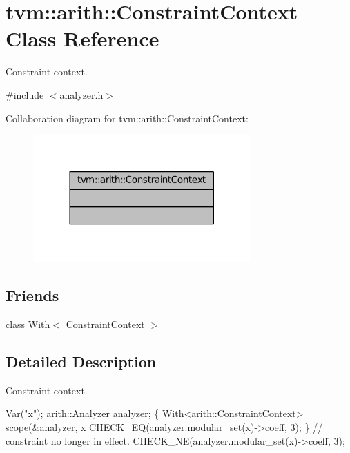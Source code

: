 \hypertarget{classtvm_1_1arith_1_1ConstraintContext}{}\section{tvm\+:\+:arith\+:\+:Constraint\+Context Class Reference}
\label{classtvm_1_1arith_1_1ConstraintContext}


Constraint context.  




{\ttfamily \#include $<$analyzer.\+h$>$}



Collaboration diagram for tvm\+:\+:arith\+:\+:Constraint\+Context\+:
\nopagebreak
\begin{figure}[H]
\begin{center}
\leavevmode
\includegraphics[width=236pt]{classtvm_1_1arith_1_1ConstraintContext__coll__graph}
\end{center}
\end{figure}
\subsection*{Friends}
\begin{DoxyCompactItemize}
\item 
class \hyperlink{classtvm_1_1arith_1_1ConstraintContext_acf0da349a64c42ae689d9459ae09f0e3}{With$<$ Constraint\+Context $>$}
\end{DoxyCompactItemize}


\subsection{Detailed Description}
Constraint context. 


\begin{DoxyCode}
Var(\textcolor{stringliteral}{"x"});
arith::Analyzer analyzer;
\{
  With<arith::ConstraintContext> scope(&analyzer, x %
  CHECK\_EQ(analyzer.modular\_set(x)->coeff, 3);
\}
\textcolor{comment}{// constraint no longer in effect.}
CHECK\_NE(analyzer.modular\_set(x)->coeff, 3);
\end{DoxyCode}
 

